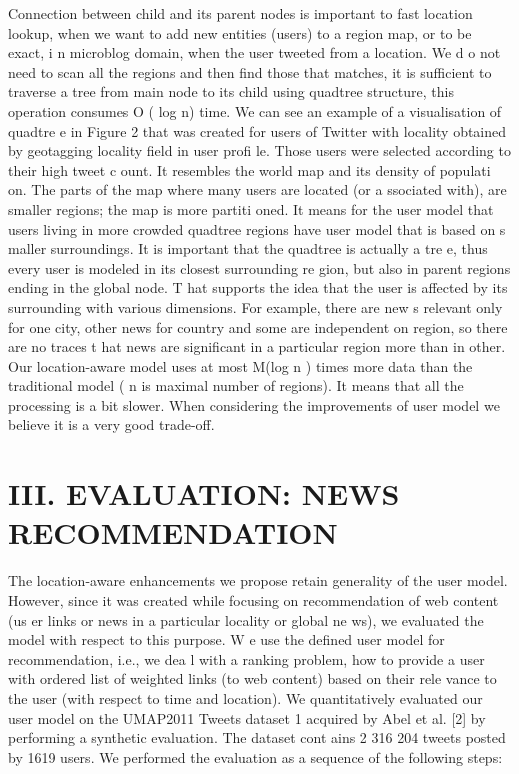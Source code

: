 \documentclass[conference]{IEEEtran}
\begin{document}
Connection   between   child   and   its   parent   nodes   is 
important to fast location lookup, when  we want to 
add new 
entities (users) to a region map, or to be exact, i
n microblog 
domain,  when  the  user  tweeted  from  a  location.  We  d
o  not 
need to scan 
all
 the regions and then find those that matches, 
it  is  sufficient  to  traverse  a  tree  from  main  node 
to  its  child 
using  quadtree  structure,  this  operation  consumes  O
(
log
  n) 
time. 
We  can  see  an  example  of  a  visualisation  of  quadtre
e  in 
Figure  2  that  was  created  for  users  of  Twitter  with
  locality 
obtained  by  geotagging  locality  field  in  user  profi
le.  Those 
users  were  selected  according  to  their  high  tweet  c
ount.  It 
resembles  the  world  map  and  its  density  of  populati
on.  The 
parts of the map where many users are located (or a
ssociated 
with),  are  smaller  regions;  the  map  is  more  partiti
oned.  It 
means  for  the  user  model  that  users  living  in  more 
crowded 
quadtree  regions  have  user  model  that  is  based  on  s
maller 
surroundings. 
It  is  important  that  the  quadtree  is  actually  a  tre
e,  thus 
every  user  is  modeled  in  its  closest  surrounding  re
gion,  but 
also  in  parent  regions  ending  in  the  global  node.  T
hat 
supports  the  idea  that  the  user  is  affected  by  its 
surrounding 
with   various   dimensions.   For   example,   there   are   new
s 
relevant  only  for  one  city,  other  news  for  country 
and  some are  independent  on  region,  so  there  are  no  traces  t
hat  news 
are significant in a particular region more than in
 other. 
Our  location-aware  model  uses  at  most  M(log 
n
)  times 
more  data  than  the  traditional  model  (
n
  is  maximal  number 
of  regions).  It  means  that  all  the  processing  is  a 
bit  slower. 
When   considering   the  improvements   of   user   model   we 
believe it is a very good trade-off.

\section*{III.   EVALUATION: NEWS RECOMMENDATION}

The   location-aware   enhancements   we   propose   retain 
generality  of  the  user  model.  However,  since  it  was
  created 
while  focusing  on  recommendation  of  web  content  (us
er 
links  or  news  in  a  particular  locality  or  global  ne
ws),  we 
evaluated the model with respect to this purpose. W
e use the 
defined user model for recommendation, i.e., we dea
l with a 
ranking  problem,  how  to  provide  a  user  with  ordered
  list  of 
weighted  links  (to  web  content)  based  on  their  rele
vance  to 
the user (with respect to time and location).  
We   quantitatively   evaluated   our   user   model   on   the 
UMAP2011  Tweets  dataset
1
  acquired  by  Abel  et  al.  [2]  by 
performing   a   synthetic   evaluation.   The   dataset   cont
ains 
2 316 204 tweets posted by 1619 users. 
We   performed   the   evaluation   as   a   sequence   of   the 
following steps: 
\end{document}
